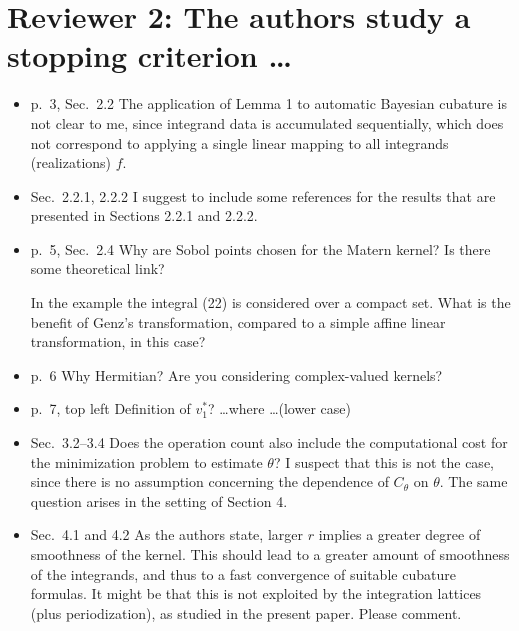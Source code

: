 \documentclass{amsart}
\begin{document}
\section*{Reviewer 2: The authors study a stopping criterion \ldots}

\begin{itemize}
\item p.\ 3, Sec.\ 2.2 The application of Lemma 1 to automatic Bayesian cubature is not clear to me, since integrand data is accumulated sequentially, which does not correspond to applying a single linear mapping to all integrands (realizations) $f$.  

\item Sec.\ 2.2.1, 2.2.2 I suggest to include some references for the results that are presented in Sections 2.2.1 and 2.2.2.  

\item p.\ 5, Sec.\ 2.4 Why are Sobol points chosen for the Matern kernel? Is there some theoretical link?  

In the example the integral (22) is considered over a compact set. What is the benefit of Genz’s transformation, compared to a simple affine linear transformation, in this case?

\item p.\ 6 Why Hermitian? Are you considering complex-valued kernels? 

\item p.\ 7, top left Definition of $v_1^*$? \ldots where \ldots (lower case) 

\item Sec.\ 3.2--3.4 Does the operation count also include the computational cost for the minimization problem to estimate $\theta$? I suspect that this is not the case, since there is no assumption concerning the dependence of $C_\theta$ on $\theta$. The same question arises in the setting of Section 4.  

\item Sec.\ 4.1 and 4.2 As the authors state, larger $r$ implies a greater degree of smoothness of the kernel. This should lead to a greater amount of smoothness of the integrands, and thus to a fast convergence of suitable cubature formulas. It might be that this is not exploited by the integration lattices (plus periodization), as studied in the present paper. Please comment.  


\end{itemize}
\end{document}
